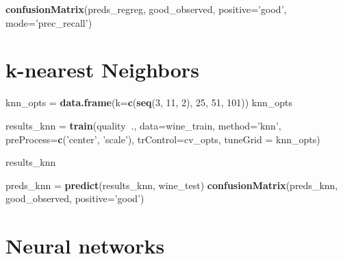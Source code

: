 \documentclass[]{book}
\newenvironment{Shaded}{\begin{snugshade}}{\end{snugshade}}
\newcommand{\KeywordTok}[1]{\textcolor[rgb]{0.13,0.29,0.53}{\textbf{#1}}}
\newcommand{\DataTypeTok}[1]{\textcolor[rgb]{0.13,0.29,0.53}{#1}}
\newcommand{\DecValTok}[1]{\textcolor[rgb]{0.00,0.00,0.81}{#1}}
\newcommand{\StringTok}[1]{\textcolor[rgb]{0.31,0.60,0.02}{#1}}
\newcommand{\OperatorTok}[1]{\textcolor[rgb]{0.81,0.36,0.00}{\textbf{#1}}}
\newcommand{\NormalTok}[1]{#1}
\begin{document}
\begin{Shaded}
\begin{Highlighting}[]
\KeywordTok{confusionMatrix}\NormalTok{(preds_regreg, good_observed, }\DataTypeTok{positive=}\StringTok{'good'}\NormalTok{, }\DataTypeTok{mode=}\StringTok{'prec_recall'}\NormalTok{)}
\end{Highlighting}
\end{Shaded}

\hypertarget{k-nearest-neighbors-1}{%
\chapter{k-nearest Neighbors}\label{k-nearest-neighbors-1}}

\begin{Shaded}
\begin{Highlighting}[]
\NormalTok{knn_opts =}\StringTok{ }\KeywordTok{data.frame}\NormalTok{(}\DataTypeTok{k=}\KeywordTok{c}\NormalTok{(}\KeywordTok{seq}\NormalTok{(}\DecValTok{3}\NormalTok{, }\DecValTok{11}\NormalTok{, }\DecValTok{2}\NormalTok{), }\DecValTok{25}\NormalTok{, }\DecValTok{51}\NormalTok{, }\DecValTok{101}\NormalTok{))}
\NormalTok{knn_opts}

\NormalTok{results_knn =}\StringTok{ }\KeywordTok{train}\NormalTok{(quality}\OperatorTok{~}\NormalTok{., }
                    \DataTypeTok{data=}\NormalTok{wine_train, }
                    \DataTypeTok{method=}\StringTok{'knn'}\NormalTok{,}
                    \DataTypeTok{preProcess=}\KeywordTok{c}\NormalTok{(}\StringTok{'center'}\NormalTok{, }\StringTok{'scale'}\NormalTok{), }
                    \DataTypeTok{trControl=}\NormalTok{cv_opts,}
                    \DataTypeTok{tuneGrid =}\NormalTok{ knn_opts)}

\NormalTok{results_knn}
\end{Highlighting}
\end{Shaded}

\begin{Shaded}
\begin{Highlighting}[]
\NormalTok{preds_knn =}\StringTok{ }\KeywordTok{predict}\NormalTok{(results_knn, wine_test)}
\KeywordTok{confusionMatrix}\NormalTok{(preds_knn, good_observed, }\DataTypeTok{positive=}\StringTok{'good'}\NormalTok{)}
\end{Highlighting}
\end{Shaded}

\hypertarget{neural-networks}{%
\chapter{Neural networks}\label{neural-networks}}
\end{document}
